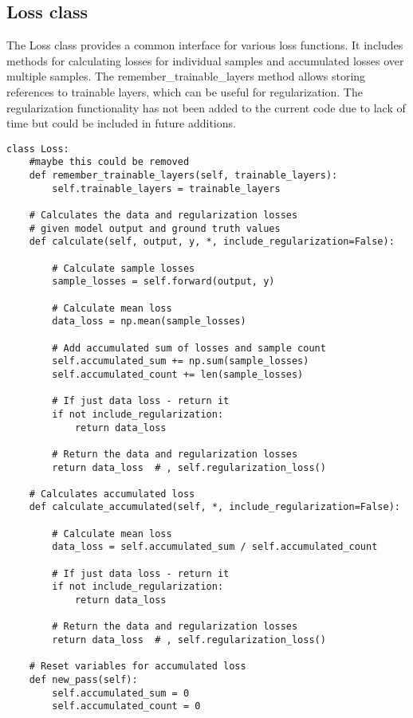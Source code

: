 \documentclass{article}
\begin{document}
\subsection{Loss class}

The Loss class provides a common interface for various loss functions. It includes methods for calculating losses for individual samples and accumulated losses over multiple samples. The remember\_trainable\_layers method allows storing references to trainable layers, which can be useful for regularization. The regularization functionality has not been added to the current code due to lack of time but could be included in future additions.

\begin{lstlisting}
class Loss:
    #maybe this could be removed
    def remember_trainable_layers(self, trainable_layers):
        self.trainable_layers = trainable_layers

    # Calculates the data and regularization losses
    # given model output and ground truth values
    def calculate(self, output, y, *, include_regularization=False):

        # Calculate sample losses
        sample_losses = self.forward(output, y)

        # Calculate mean loss
        data_loss = np.mean(sample_losses)

        # Add accumulated sum of losses and sample count
        self.accumulated_sum += np.sum(sample_losses)
        self.accumulated_count += len(sample_losses)

        # If just data loss - return it
        if not include_regularization:
            return data_loss

        # Return the data and regularization losses
        return data_loss  # , self.regularization_loss()

    # Calculates accumulated loss
    def calculate_accumulated(self, *, include_regularization=False):

        # Calculate mean loss
        data_loss = self.accumulated_sum / self.accumulated_count

        # If just data loss - return it
        if not include_regularization:
            return data_loss

        # Return the data and regularization losses
        return data_loss  # , self.regularization_loss()

    # Reset variables for accumulated loss
    def new_pass(self):
        self.accumulated_sum = 0
        self.accumulated_count = 0

\end{lstlisting}
\end{document}
